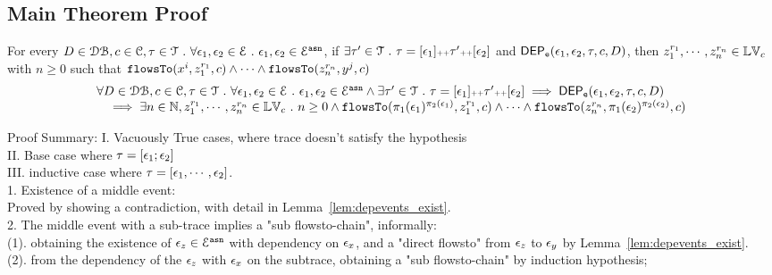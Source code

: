 \subsection{Main Theorem Proof}
\begin{thm}
\label{thm:flowsto_event_soundness}
For every $D \in \mathcal{DB} , c \in \mathcal{C}, \mathtt{\tau} \in \mathcal{T} ~.~ \forall \mathtt{\epsilon}_1, \mathtt{\epsilon}_2 \in \mathcal{E} ~.~
\mathtt{\epsilon}_1, \mathtt{\epsilon}_2 \in \mathcal{E}^{\mathtt{{asn}}}$, 
if $\exists \mathtt{\tau}' \in \mathcal{T} ~.~ \mathtt{\tau} = [\mathtt{\epsilon}_1] {\scriptscriptstyle ++} \mathtt{\tau}' {\scriptscriptstyle ++} [\mathtt{\epsilon}_2]$ and 
$\mathsf{DEP_{\mathtt{e}}}(\mathtt{\epsilon}_1, \mathtt{\epsilon}_2, \mathtt{\tau}, c, D) $, then
 $z_1^{r_1}, \cdots, z_n^{r_n} \in \mathbb{LV}_{{c}}$ with $n \geq 0$ such that   
$\mathtt{flowsTo}(x^i,  z_1^{r_1}, c) 
\land \cdots \land \mathtt{flowsTo}(z_n^{r_n}, y^j, c)$
%
\[
  \begin{array}{l}
		\forall D \in \mathcal{DB} , c \in \mathcal{C}, \mathtt{\tau} \in \mathcal{T} ~.~ \forall \mathtt{\epsilon}_1, \mathtt{\epsilon}_2 \in \mathcal{E} ~.~
    \mathtt{\epsilon}_1, \mathtt{\epsilon}_2 \in \mathcal{E}^{\mathtt{{asn}}} \land 
		 \exists \mathtt{\tau}' \in \mathcal{T} ~.~ \mathtt{\tau} = [\mathtt{\epsilon}_1] {\scriptscriptstyle ++} \mathtt{\tau}' {\scriptscriptstyle ++} [\mathtt{\epsilon}_2]
		\implies
		\mathsf{DEP_{\mathtt{e}}}(\mathtt{\epsilon}_1, \mathtt{\epsilon}_2, \mathtt{\tau}, c, D) 
		\\ \quad 
		\implies 
    \exists n \in \mathbb{N}, z_1^{r_1}, \cdots, z_n^{r_n} \in \mathbb{LV}_{{c}} ~.~ n \geq 0 \land
		\mathtt{flowsTo}(\pi_1(\mathtt{\epsilon}_1)^{\pi_2(\mathtt{\epsilon}_1)},  z_1^{r_1}, c) 
    \land \cdots \land \mathtt{flowsTo}(z_n^{r_n}, \pi_1(\mathtt{\epsilon}_2)^{\pi_2(\mathtt{\epsilon}_2)}, c) 
	\end{array}
\]
\end{thm}
Proof Summary:
I. Vacuously True cases, where trace doesn't satisfy the hypothesis 
\\
II. Base case where $\mathtt{\tau} = [\mathtt{\epsilon}_1;\mathtt{\epsilon}_2]$
\\
III. inductive case where $\mathtt{\tau} = [\mathtt{\epsilon}_1, \cdots, \mathtt{\epsilon}_2]$.
\\
1. Existence of a middle event:
\\
Proved by showing a contradiction, with detail in Lemma~\ref{lem:depevents_exist}.
%
\\
2. The middle event with a sub-trace implies a "sub flowsto-chain", informally:
%
\\
(1). obtaining the existence of $\mathtt{\epsilon}_z \in \mathcal{E}^{\mathtt{{asn}}} $ with dependency on $\mathtt{\epsilon}_x$, and a "direct flowsto" from $\mathtt{\epsilon}_z$ to $\mathtt{\epsilon}_y$
by Lemma~\ref{lem:depevents_exist}.
 \\
(2). from the dependency of the $\mathtt{\epsilon}_z$ with $\mathtt{\epsilon}_x$ on the subtrace,
 obtaining a "sub flowsto-chain" by induction  hypothesis;
 \\
